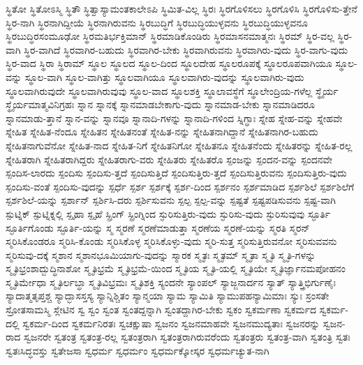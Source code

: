 {ಸ್ಥಿತೋ
ಸ್ಥಿತೋಽಸ್ಮಿ
ಸ್ಥಿತೌ
ಸ್ಥಿತ್ವಾಸ್ಯಾಮಂತಕಾಲೇಽಪಿ
ಸ್ಥಿಮಿತ-ವಿಲ್ಲ
ಸ್ಥಿರಃ
ಸ್ಥಿರಗೊಳಿಸಲು
ಸ್ಥಿರಗೊಳಿಸಿ
ಸ್ಥಿರಗೊಳಿಸು-ತ್ತೇನೆ
ಸ್ಥಿರ-ನಾಗಿ
ಸ್ಥಿರನಾಗಿದ್ದೀಯೆ
ಸ್ಥಿರನಾಗಿರುವನು
ಸ್ಥಿರಬುದ್ಧಿಗೆ
ಸ್ಥಿರಬುದ್ಧಿಯುಳ್ಳವನು
ಸ್ಥಿರಬುದ್ಧಿಯುಳ್ಳವನೂ
ಸ್ಥಿರಬುದ್ಧಿರಸಂಮೂಢೋ
ಸ್ಥಿರಮತಿರ್ಭಕ್ತಿಮಾನ್
ಸ್ಥಿರಮಾಡಿಕೊಂಡಿರು
ಸ್ಥಿರಮಾಸನಮಾತ್ಮನಃ
ಸ್ಥಿರಮ್
ಸ್ಥಿರ-ವಲ್ಲ
ಸ್ಥಿರ-ವಾಗಿ
ಸ್ಥಿರ-ವಾಗಿದೆ
ಸ್ಥಿರವಾಗಿರ-ಬಹುದು
ಸ್ಥಿರವಾಗಿರ-ಬೇಕು
ಸ್ಥಿರವಾಗಿರುವನು
ಸ್ಥಿರವಾಗಿರು-ವುದು
ಸ್ಥಿರ-ವಾಗು-ವುದು
ಸ್ಥಿರ-ವಾದ
ಸ್ಥಿರಾ
ಸ್ಥಿರಾಮ್
ಸ್ಥೂಲ
ಸ್ಥೂಲದ
ಸ್ಥೂಲ-ದಿಂದ
ಸ್ಥೂಲದೇಹ
ಸ್ಥೂಲರೂಪಕ್ಕೆ
ಸ್ಥೂಲರೂಪವಾಗಿಯೂ
ಸ್ಥೂಲ-ವನ್ನು
ಸ್ಥೂಲ-ವಾಗಿ
ಸ್ಥೂಲ-ವಾಗಿತ್ತು
ಸ್ಥೂಲವಾಗಿಯೂ
ಸ್ಥೂಲವಾಗಿರು-ವುದನ್ನು
ಸ್ಥೂಲವಾಗಿರು-ವುದು
ಸ್ಥೂಲವಾಗಿರುವುದೇ
ಸ್ಥೂಲವಾಗಿರುವುವು
ಸ್ಥೂಲ-ವಾದ
ಸ್ಥೂಲಶಕ್ತಿ
ಸ್ಥೂಲಾವಸ್ಥೆಗೆ
ಸ್ಥೂಲೇಂದ್ರಿಯ-ಗಳೆಲ್ಲ
ಸ್ಥೈರ್ಯ
ಸ್ಥೈರ್ಯಮಾತ್ಮವಿನಿಗ್ರಹಃ
ಸ್ನಾನ
ಸ್ನಾನಕ್ಕೆ
ಸ್ನಾನಮಾಡಬೇಕಾಗು-ವುದು
ಸ್ನಾನಮಾಡ-ಬೇಕು
ಸ್ನಾನಮಾಡಿದರೂ
ಸ್ನಾನಮಾಡು-ತ್ತಾನೆ
ಸ್ನಾನ-ವನ್ನು
ಸ್ನಾನವೂ
ಸ್ನಾನಾದಿ-ಗಳನ್ನು
ಸ್ನಾನಾದಿ-ಗಳಿಂದ
ಸ್ನಿಗ್ಧಾಃ
ಸ್ನೇಹ
ಸ್ನೇಹ-ವನ್ನು
ಸ್ನೇಹವೇ
ಸ್ನೇಹಿತ
ಸ್ನೇಹಿತ-ನೆಂದೂ
ಸ್ನೇಹಿತನ
ಸ್ನೇಹಿತನಂತೆ
ಸ್ನೇಹಿತ-ನನ್ನು
ಸ್ನೇಹಿತನಾಗಿದ್ದಾನೆ
ಸ್ನೇಹಿತನಾಗಿರ-ಬಹುದು
ಸ್ನೇಹಿತನಾಗುವೆನೋ
ಸ್ನೇಹಿತ-ನಾದ
ಸ್ನೇಹಿತ-ನಿಗೆ
ಸ್ನೇಹಿತನಿಗೋ
ಸ್ನೇಹಿತನೂ
ಸ್ನೇಹಿತನೆಂದು
ಸ್ನೇಹಿತರನ್ನು
ಸ್ನೇಹಿತ-ರಲ್ಲ
ಸ್ನೇಹಿತರಾಗಿ
ಸ್ನೇಹಿತರಾಗಿದ್ದರು
ಸ್ನೇಹಿತರಾಗು-ವರು
ಸ್ನೇಹಿತರು
ಸ್ನೇಹಿತರೊ
ಸ್ಪಂಜನ್ನು
ಸ್ಪಂದನ-ವನ್ನು
ಸ್ಪಂದನವೇ
ಸ್ಪಂದಿಸ-ಲಾರದು
ಸ್ಪಂದಿಸು
ಸ್ಪಂದಿಸು-ತ್ತದೆ
ಸ್ಪಂದಿಸುತ್ತಿದೆ
ಸ್ಪಂದಿಸುತ್ತಿರು-ತ್ತದೆ
ಸ್ಪಂದಿಸುತ್ತಿರುವನು
ಸ್ಪಂದಿಸುತ್ತಿರು-ವುದು
ಸ್ಪಂದಿಸು-ವಂತೆ
ಸ್ಪಂದಿಸು-ವುದನ್ನು
ಸ್ಪರ್ಧೆ
ಸ್ಪರ್ಶ
ಸ್ಪರ್ಶಕ್ಕೆ
ಸ್ಪರ್ಶ-ದಿಂದ
ಸ್ಪರ್ಶನಂ
ಸ್ಪರ್ಶಮಾಡಿದ
ಸ್ಪರ್ಶಶಿಲೆ
ಸ್ಪರ್ಶಶಿಲೆಗೆ
ಸ್ಪರ್ಶಶಿಲೆ-ಯನ್ನು
ಸ್ಪರ್ಶಾನ್
ಸ್ಪರ್ಶಿಸಿ-ದರು
ಸ್ಪರ್ಶಿಸುವನು
ಸ್ಪಲ್ಪ
ಸ್ಪಲ್ಪ-ವನ್ನು
ಸ್ಪಷ್ಟತೆ
ಸ್ಪಷ್ಟಪಡಿಸುವನು
ಸ್ಪಷ್ಟ-ವಾಗಿ
ಸ್ಪುಟ್ನಿಕ್
ಸ್ಪುಟ್ನಿಕ್ನಲ್ಲಿ
ಸ್ಪೃಹಾ
ಸ್ಪೃಹೆ
ಸ್ಪ್ರಿಂಗ್
ಸ್ಪ್ರಿಂಗ್ನಿಂದ
ಸ್ಫುರಿಸುತ್ತಿರು-ವುದು
ಸ್ಫುರಿಸು-ವುದು
ಸ್ಫುರಿಸುವುವು
ಸ್ಫೂರ್ತಿ
ಸ್ಫೂರ್ತಿಗೊಂಡು
ಸ್ಫೂರ್ತಿ-ಯನ್ನು
ಸ್ಮ
ಸ್ಮರಣೆ
ಸ್ಮರಣೆಮಾಡುತ್ತಾ
ಸ್ಮರಣೆಯ
ಸ್ಮರಣೆ-ಯನ್ನು
ಸ್ಮರತಿ
ಸ್ಮರನ್
ಸ್ಮರಿಸಿಕೊಂಡರೂ
ಸ್ಮರಿಸಿ-ಕೊಂಡು
ಸ್ಮರಿಸಿಕೊಳ್ಳ
ಸ್ಮರಿಸಿಕೊಳ್ಳು-ವುದು
ಸ್ಮರಿ-ಸುತ್ತ
ಸ್ಮರಿಸುತ್ತಿರುವನೋ
ಸ್ಮರಿಸುವವನು
ಸ್ಮರಿಸುವು-ದಕ್ಕೆ
ಸ್ಮಶಾನ
ಸ್ಮಶಾನಭೂಮಿಯಾಗು-ವುದನ್ನು
ಸ್ಮಾರಕ
ಸ್ಮೃತಃ
ಸ್ಮೃತಮ್
ಸ್ಮೃತಾ
ಸ್ಮೃತಿ
ಸ್ಮೃತಿ-ಗಳನ್ನು
ಸ್ಮೃತಿಭ್ರಂಶಾದ್ಬುದ್ಧಿನಾಶೋ
ಸ್ಮೃತಿಭ್ರಮೆ
ಸ್ಮೃತಿಭ್ರಮೆ-ಯಿಂದ
ಸ್ಮೃತಿಯ
ಸ್ಮೃತಿ-ಯಲ್ಲಿ
ಸ್ಮೃತಿಯೇ
ಸ್ಮೃತಿರ್ಜ್ಞಾನಮಪೋಹನಂ
ಸ್ಮೃತಿರ್ಮೇಧಾ
ಸ್ಮೃತಿರ್ಲಬ್ಧಾ
ಸ್ಮೃತಿವಿಭ್ರಮಃ
ಸ್ಮೃತಿಶಕ್ತಿ
ಸ್ಯಂದನೇ
ಸ್ಯಾಂಪಲ್
ಸ್ಯಾಜ್ಜನಾರ್ದನ
ಸ್ಯಾತ್
ಸ್ಯಾತ್ತ್ರಿಭಿರ್ಗುಣೈಃ
ಸ್ಯಾದಾತ್ಮತೃಪ್ತಶ್ಚ
ಸ್ಯಾದ್ಭಾಸಸ್ತಸ್ಯ
ಸ್ಯಾನ್ನಿಶ್ಚಿತಂ
ಸ್ಯಾನ್ಮಯಾ
ಸ್ಯಾಮ
ಸ್ಯಾಮಿತಿ
ಸ್ಯಾಮುಪಹನ್ಯಾಮಿಮಾಃ
ಸ್ಯುಃ
ಸ್ರಂಸತೇ
ಸ್ರೋತಸಾಮಸ್ಮಿ
ಸ್ಲೇಟಿನ
ಸ್ವ
ಸ್ವಂ
ಸ್ವಂತ
ಸ್ವಂತದ್ದನ್ನಾಗಿ
ಸ್ವಂತದ್ದಾಗಿರ-ಬೇಕು
ಸ್ವಕಂ
ಸ್ವಕರ್ಮಣಾ
ಸ್ವಕರ್ಮದ
ಸ್ವಕರ್ಮ-ದಲ್ಲಿ
ಸ್ವಕರ್ಮ-ದಿಂದ
ಸ್ವಕರ್ಮನಿರತಃ
ಸ್ವಚಕ್ಷುಷಾ
ಸ್ವಜನಂ
ಸ್ವಜನಮಾಹವೇ
ಸ್ವಜನಮುದ್ಯತಾಃ
ಸ್ವಜನರನ್ನು
ಸ್ವಜನ-ರಾದ
ಸ್ವಜನರೇ
ಸ್ವತಂತ್ರ
ಸ್ವತಂತ್ರ-ರಲ್ಲ
ಸ್ವತಂತ್ರರಾಗಿ
ಸ್ವತಂತ್ರರಾಗಿರುವರೆಂದು
ಸ್ವತಂತ್ರರು
ಸ್ವತಂತ್ರ-ವಾಗಿ
ಸ್ವತಂತ್ರಿ
ಸ್ವತಃ
ಸ್ವತಃಸಿದ್ಧವಸ್ತು
ಸ್ವತೇಜಸಾ
ಸ್ವಧರ್ಮ
ಸ್ವಧರ್ಮಂ
ಸ್ವಧರ್ಮಕ್ಕೋಸ್ಕರ
ಸ್ವಧರ್ಮಚ್ಯುತ-ನಾಗಿ
}
